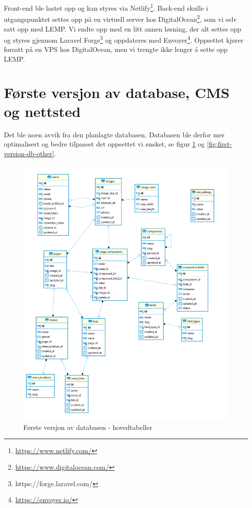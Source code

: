 Front-end ble lastet opp og kan styres via Netlify\footnote{\url{https://www.netlify.com/}}. Back-end skulle i utgangspunktet settes opp på en virtuell server hos DigitalOcean\footnote{\url{https://www.digitalocean.com/}}, som vi selv satt opp med LEMP. Vi endte opp med en litt annen løsning, der alt settes opp og styres gjennom Laravel Forge\footnote{https://forge.laravel.com/} og oppdateres med Envoyer\footnote{\url{https://envoyer.io/}}. Oppsettet kjører forsatt på en VPS hos DigitalOcean, men vi trengte ikke lenger å sette opp LEMP.

\section{Første versjon av database, CMS og nettsted}
Det ble noen avvik fra den planlagte databasen. Databasen ble derfor mer optimalisert og bedre tilpasset det oppsettet vi ønsket, se figur \ref{fig:first-version-db} og \ref{fig:first-version-db-other}.

\begin{figure}[H]
    \centering
    \includegraphics[width=\textwidth]{bjornar/db-endelig.png}
    \caption{Første versjon av databasen - hovedtabeller}
    \label{fig:first-version-db}
\end{figure}

